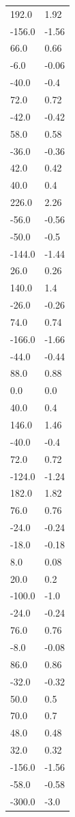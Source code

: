 \begin{longtable}{ll}
192.0 & 1.92 \\
-156.0 & -1.56 \\
66.0 & 0.66 \\
-6.0 & -0.06 \\
-40.0 & -0.4 \\
72.0 & 0.72 \\
-42.0 & -0.42 \\
58.0 & 0.58 \\
-36.0 & -0.36 \\
42.0 & 0.42 \\
40.0 & 0.4 \\
226.0 & 2.26 \\
-56.0 & -0.56 \\
-50.0 & -0.5 \\
-144.0 & -1.44 \\
26.0 & 0.26 \\
140.0 & 1.4 \\
-26.0 & -0.26 \\
74.0 & 0.74 \\
-166.0 & -1.66 \\
-44.0 & -0.44 \\
88.0 & 0.88 \\
0.0 & 0.0 \\
40.0 & 0.4 \\
146.0 & 1.46 \\
-40.0 & -0.4 \\
72.0 & 0.72 \\
-124.0 & -1.24 \\
182.0 & 1.82 \\
76.0 & 0.76 \\
-24.0 & -0.24 \\
-18.0 & -0.18 \\
8.0 & 0.08 \\
20.0 & 0.2 \\
-100.0 & -1.0 \\
-24.0 & -0.24 \\
76.0 & 0.76 \\
-8.0 & -0.08 \\
86.0 & 0.86 \\
-32.0 & -0.32 \\
50.0 & 0.5 \\
70.0 & 0.7 \\
48.0 & 0.48 \\
32.0 & 0.32 \\
-156.0 & -1.56 \\
-58.0 & -0.58 \\
-300.0 & -3.0 \\

\end{longtable}
